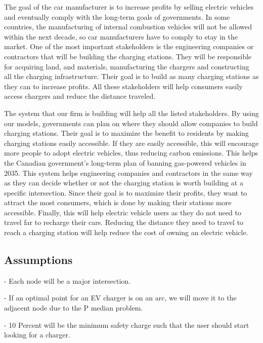 \documentclass[12pt, fleqn]{article}
\begin{document}
\medskip

The goal of the car manufacturer is to increase profits by selling electric vehicles and eventually comply with the long-term goals of governments. In some countries, the manufacturing of internal combustion vehicles will not be allowed within the next decade, so car manufacturers have to comply to stay in the market. One of the most important stakeholders is the engineering companies or contractors that will be building the charging stations. They will be responsible for acquiring land, and materials, manufacturing the chargers and constructing all the charging infrastructure. Their goal is to build as many charging stations as they can to increase profits. All these stakeholders will help consumers easily access chargers and reduce the distance traveled.

\medskip

The system that our firm is building will help all the listed stakeholders. By using our models, governments can plan on where they should allow companies to build charging stations. Their goal is to maximize the benefit to residents by making charging stations easily accessible. If they are easily accessible, this will encourage more people to adopt electric vehicles, thus reducing carbon emissions. This helps the Canadian government's long-term plan of banning gas-powered vehicles in 2035. This system helps engineering companies and contractors in the same way as they can decide whether or not the charging station is worth building at a specific intersection. Since their goal is to maximize their profits, they want to attract the most consumers, which is done by making their stations more accessible. Finally, this will help electric vehicle users as they do not need to travel far to recharge their cars. Reducing the distance they need to travel to reach a charging station will help reduce the cost of owning an electric vehicle.


\subsection{Assumptions}

- Each node will be a major intersection.

- If an optimal point for an EV charger is on an arc, we will move it to the adjacent node due to the P median problem.

- 10 Percent will be the minimum safety charge such that the user should start looking for a charger.
\end{document}
